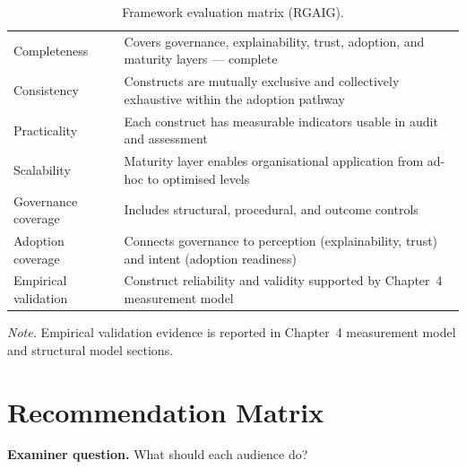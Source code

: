 {\tablestripes\tablefontsize
{}
\begin{xltabular}{\textwidth}{@{} >{\raggedright\arraybackslash}p{4.0cm} L @{}}
\caption[Framework evaluation matrix]{Framework evaluation matrix (RGAIG).}\label{tab:dist_framework_evaluation} \\
\toprule
{} &  \\
\midrule
\endfirsthead
\endhead
\bottomrule
\endlastfoot
Completeness & Covers governance, explainability, trust, adoption, and maturity layers --- complete \\
\addlinespace
Consistency & Constructs are mutually exclusive and collectively exhaustive within the adoption pathway \\
\addlinespace
Practicality & Each construct has measurable indicators usable in audit and assessment \\
\addlinespace
Scalability & Maturity layer enables organisational application from ad-hoc to optimised levels \\
\addlinespace
Governance coverage & Includes structural, procedural, and outcome controls \\
\addlinespace
Adoption coverage & Connects governance to perception (explainability, trust) and intent (adoption readiness) \\
\addlinespace
Empirical validation & Construct reliability and validity supported by Chapter~4 measurement model \\
\end{xltabular}}

\vspace{0.3em}\noindent\textit{Note.} Empirical validation evidence is reported in Chapter~4 measurement model and structural model sections.


\section{Recommendation Matrix}
\label{app:distinction_recommendation_matrix}

\noindent\textbf{Examiner question.} What should each audience do?

